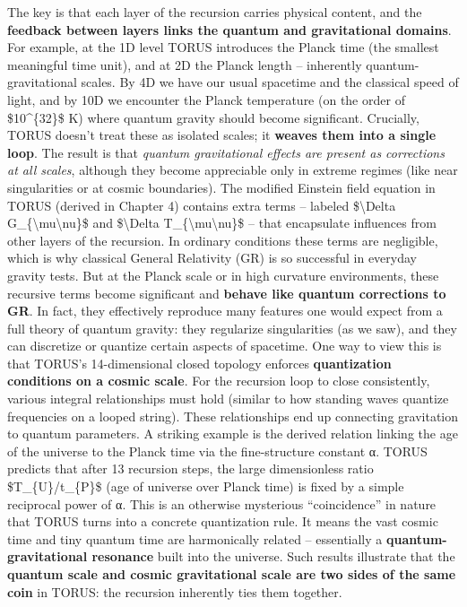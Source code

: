 \documentclass[
]{article}
\begin{document}
The key is that each layer of the recursion carries physical content,
and the \textbf{feedback between layers links the quantum and
gravitational domains}. For example, at the 1D level TORUS introduces
the Planck time (the smallest meaningful time unit), and at 2D the
Planck length -- inherently quantum-gravitational scales. By 4D we have
our usual spacetime and the classical speed of light, and by 10D we
encounter the Planck temperature (on the order of \$10\^{}\{32\}\$ K)
where quantum gravity should become significant. Crucially, TORUS
doesn't treat these as isolated scales; it \textbf{weaves them into a
single loop}. The result is that \emph{quantum gravitational effects are
present as corrections at all scales}, although they become appreciable
only in extreme regimes (like near singularities or at cosmic
boundaries). The modified Einstein field equation in TORUS (derived in
Chapter 4) contains extra terms -- labeled \$\textbackslash Delta
G\_\{\textbackslash mu\textbackslash nu\}\$ and \$\textbackslash Delta
T\_\{\textbackslash mu\textbackslash nu\}\$ -- that encapsulate
influences from other layers of the recursion\hspace{0pt}. In ordinary
conditions these terms are negligible, which is why classical General
Relativity (GR) is so successful in everyday gravity tests. But at the
Planck scale or in high curvature environments, these recursive terms
become significant and \textbf{behave like quantum corrections to GR}.
In fact, they effectively reproduce many features one would expect from
a full theory of quantum gravity: they regularize singularities (as we
saw), and they can discretize or quantize certain aspects of spacetime.
One way to view this is that TORUS's 14-dimensional closed topology
enforces \textbf{quantization conditions on a cosmic scale}. For the
recursion loop to close consistently, various integral relationships
must hold (similar to how standing waves quantize frequencies on a
looped string). These relationships end up connecting gravitation to
quantum parameters. A striking example is the derived relation linking
the age of the universe to the Planck time via the fine-structure
constant α. TORUS predicts that after 13 recursion steps, the large
dimensionless ratio \$T\_\{U\}/t\_\{P\}\$ (age of universe over Planck
time) is fixed by a simple reciprocal power of α\hspace{0pt}. This is an
otherwise mysterious ``coincidence'' in nature that TORUS turns into a
concrete quantization rule. It means the vast cosmic time and tiny
quantum time are harmonically related -- essentially a
\textbf{quantum-gravitational resonance} built into the universe. Such
results illustrate that the \textbf{quantum scale and cosmic
gravitational scale are two sides of the same coin} in TORUS: the
recursion inherently ties them together.
\end{document}
